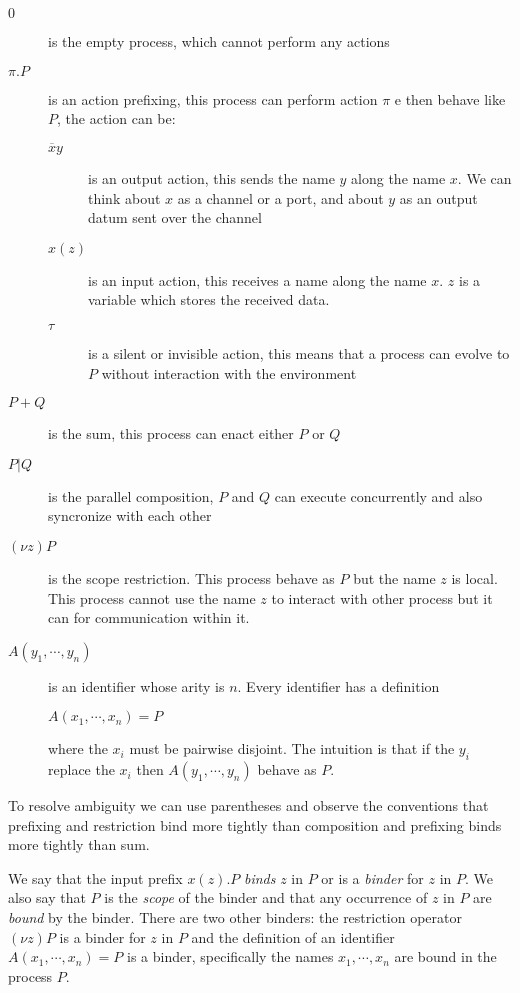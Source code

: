 \begin{description}
  \item[$0$] 
    is the empty process, which cannot perform any actions
  \item[$\pi.P$] 
    is an action prefixing, this process can perform action $\pi$ e then behave like $P$, the action can be:
    \begin{description}
      \item[$\overline{x}y$] 
	is an output action, this sends the name $y$ along the name $x$. We can think about $x$ as a channel or a port, and about $y$ as an output datum sent over the channel
      \item[$x(z)$] 
	is an input action, this receives a name along the name $x$. $z$ is a variable which stores the received data.
      \item[$\tau$] 
	is a silent or invisible action, this means that a process can evolve to $P$ without interaction with the environment 
    \end{description}
  \item[$P+Q$] 
    is the sum, this process can enact either $P$ or $Q$
  \item[$P|Q$] 
    is the parallel composition, $P$ and $Q$ can execute concurrently and also syncronize with each other
  \item[$(\nu z) P$] 
    is the scope restriction. This process behave as $P$ but the name $z$ is local. This process cannot use the name $z$ to interact with other process but it can for communication within it.
  \item[$A(y_{1}, \cdots, y_{n})$] 
    is an identifier whose arity is $n$. Every identifier has a definition
    \begin{center}
      $A(x_{1}, \cdots, x_{n}) = P$
    \end{center}
    where the $x_{i}$ must be pairwise disjoint. The intuition is that if the $y_{i}$ replace the $x_{i}$ then $A(y_{1}, \cdots, y_{n})$ behave as $P$. 
\end{description}

To resolve ambiguity we can use parentheses and observe the conventions that prefixing and restriction bind more tightly than composition and prefixing binds more tightly than sum. 

\begin{definition}    
  We say that the input prefix $x(z).P$ \emph{binds} $z$ in $P$ or is a \emph{binder} for $z$ in $P$. We also say that $P$ is the \emph{scope} of the binder and that any occurrence of $z$ in $P$ are \emph{bound} by the binder. There are two other binders: the restriction operator $(\nu z)P$ is a binder for $z$ in $P$ and the definition of an identifier $A(x_{1}, \cdots, x_{n}) = P$ is a binder, specifically the names $x_{1}, \cdots, x_{n}$ are bound in the process $P$.
\end{definition}

